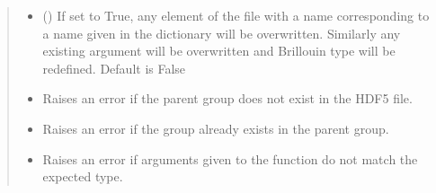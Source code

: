 \documentclass[letterpaper,10pt,english]{sphinxmanual}
\begin{document}
\begin{fulllineitems}
\begin{fulllineitems}
\begin{quote}
\begin{description}
\begin{itemize}
\item {} 
\sphinxAtStartPar
{} (\sphinxstyleliteralemphasis{\sphinxupquote{, }}) \textendash{} If set to True, any element of the file with a name corresponding to a name given in the dictionary will be overwritten. Similarly any existing argument will be overwritten and Brillouin type will be redefined. Default is False

\end{itemize}

\begin{itemize}
\item {} 
\sphinxAtStartPar
{} \textendash{} Raises an error if the parent group does not exist in the HDF5 file.

\item {} 
\sphinxAtStartPar
{} \textendash{} Raises an error if the group already exists in the parent group.

\item {} 
\sphinxAtStartPar
{} \textendash{} Raises an error if arguments given to the function do not match the expected type.

\end{itemize}

\end{description}\end{quote}

\end{fulllineitems}



\end{fulllineitems}
\end{document}
